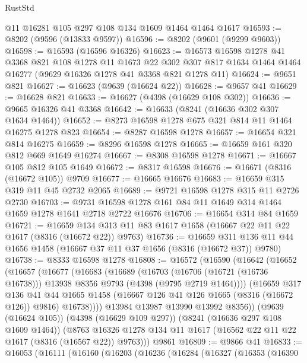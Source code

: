 \begin{lexlean}{RustStd}
\begin{coremodule}
    @11
    @16281
    @105
    @297
    @108
    @134
    @1609
    @1464
    @1464
    @1617
@16593 := @8202 (@9596 (@13833 @9597))
@16596 := @8202 (@9601 (@9299 @9603))
@16598 := @16593 (@16596 @16326)
@16623 := @16573
    @16598
    @1278
    @41
    @3368
    @821
    @108
    @1278
    @11
    @1673
    @22
    @302
    @307
    @817
    @1634
    @1464
    @1464
    @16277
    (@9629 @16326 @1278 @41 @3368 @821 @1278 @11)
@16624 := @9651 @821
@16627 := @16623 (@9639 (@16624 @22))
@16628 := @9657 @41
@16629 := @16628 @821
@16633 := @16627 (@4398 (@16629 @108 @302))
@16636 := @9665 @16326 @41 @3368
@16642 := @16633 (@8241 (@16636 @302 @307 @1634 @1464))
@16652 := @8273 @16598 @1278 @675 @321 @814 @11 @1464 @16275 @1278 @823
@16654 := @8287 @16598 @1278
@16657 := @16654 @321 @814 @16275
@16659 := @8296 @16598 @1278
@16665 := @16659 @161 @320 @812 @669 @1649 @16274
@16667 := @8308 @16598 @1278
@16671 := @16667 @105 @812 @105 @1649
@16672 := @8317 @16598
@16676 := @16671 (@8316 (@16672 @105)) @9709
@16677 := @16665 @16676
@16683 := @16659 @315 @319 @11 @45 @2732 @2065
@16689 := @9721 @16598 @1278 @315 @11 @2726 @2730
@16703 := @9731 @16598 @1278 @161 @84 @11 @1649 @314 @1464 @1659 @1278 @1641 @2718 @2722 @16676
@16706 := @16654 @314 @84 @1659
@16721 := @16659 @134 @313 @11 @83 @1617 @1658 (@16667 @22 @11 @22 @1617 (@8316 (@16672 @22)) @9763)
@16736 := @16659 @311 @136 @11 @44 @1656 @1458 (@16667 @37 @11 @37 @1656 (@8316 (@16672 @37)) @9780)
@16738 := @8333 @16598 @1278
@16808 := @16572
    (@16590
      (@16642
        (@16652
          (@16657
            (@16677
              (@16683
                (@16689
                  (@16703
                    (@16706 (@16721 (@16736 @16738)))
                    @13938
                    @8356
                    @9793
                    (@4398 (@9795 @2719 @1464))))
                (@16659
                  @317
                  @136
                  @41
                  @44
                  @1665
                  @1458
                  (@16667 @126 @41 @126 @1665 (@8316 (@16672 @126)) @9816)
                  @16738))))
          @13984
          @13987
          @13990
          @13992
          @8356))
      (@9639 (@16624 @105))
      (@4398 (@16629 @109 @297))
      (@8241 (@16636 @297 @108 @1609 @1464))
      (@8763 @16326 @1278 @134 @11 @1617 (@16562 @22 @11 @22 @1617 (@8316 (@16567 @22)) @9763)))
    @9861
@16809 := @9866 @41
@16833 := @16053
    (@16111
      (@16160
        (@16203
          (@16236
            (@16284
              (@16327
                (@16353
                  (@16390

\end{coremodule}
\end{lexlean}
